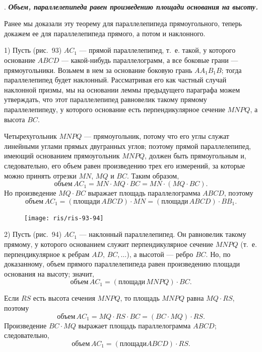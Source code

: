 \documentclass[twoside]{book}
\begin{document}
\paragraph{}\label{1938/s87}
.
\textbf{\emph{Объем, параллелепипеда равен произведению площади основания на высоту.}}

Ранее мы доказали эту теорему для параллелепипеда прямоугольного, теперь докажем ее для параллелепипеда прямого, а потом и наклонного.

1) Пусть (рис.~93) $AC_1$ --- прямой параллелепипед, т.~е. такой, у которого основание $ABCD$ --- какой-нибудь параллелограмм, а все боковые грани --- прямоугольники.
Возьмем в нем за основание боковую грань $AA_1B_1B$;
тогда параллелепипед будет наклонный.
Рассматривая его как частный случай наклонной призмы, мы на основании леммы предыдущего параграфа можем утверждать, что этот параллелепипед равновелик такому прямому параллелепипеду, у которого основание есть перпендикулярное сечение $MNPQ$, а высота $BC$.

Четырехугольник $MNPQ$ --- прямоугольник, потому что его углы служат линейными углами прямых двугранных углов;
поэтому прямой параллелепипед, имеющий основанием прямоугольник $MNPQ$, должен быть прямоугольным и, следовательно, его объем равен произведению трех его измерений, за которые можно принять отрезки $MN$, $MQ$ и $BC$.
Таким образом,
\[\text{объем}\, AC_1 = MN\cdot MQ\cdot BC = MN\cdot (MQ\cdot BC).\]
Но произведение $MQ\cdot BC$ выражает площадь параллелограмма $ABCD$, поэтому
\[
\text{объем}\, AC_1
= (\text{площади}\, ABCD)\cdot MN
= (\text{площади}\, ABCD)\cdot BB_1.
\]

\begin{figure}[h!]
\centering
\texttt{[image: ris/ris-93-94]}
\caption{}
\end{figure}

2) Пусть (рис.~94) $AC_1$ --- наклонный параллелепипед.
Он равновелик такому прямому, у которого основанием служит перпендикулярное сечение $MNPQ$ (т.~е. перпендикулярное к ребрам $AD$, $BC,\dots$), а высотой --- ребро $BC$.
Но, по доказанному, объем прямого параллелепипеда равен произведению площади основания на высоту;
значит,
\[\text{объем}\, AC_1 = (\text{площади}\, MNPQ)\cdot BC.\]

Если $RS$ есть высота сечения $MNPQ$, то площадь $MNPQ$ равна $MQ\cdot RS$, поэтому
\[\text{объем}\, AC_1 = MQ\cdot RS\cdot BC = (BC\cdot MQ)\cdot RS.\]
Произведение $BC\cdot MQ$ выражает площадь параллелограмма $ABCD$;
следовательно, 
\[\text{объем}\, AC_1 =(площади ABCD) \cdot RS.\]
\end{document}
